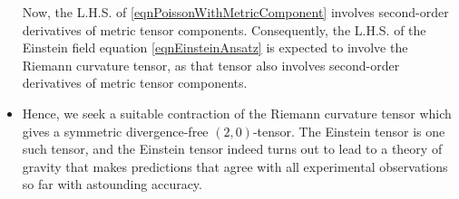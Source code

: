 \begin{itemize}
	Now, the L.H.S. of \eqref{eqnPoissonWithMetricComponent} involves
	second-order derivatives of metric tensor components.
	Consequently, the L.H.S. of the Einstein field equation \eqref{eqnEinsteinAnsatz} is expected to involve
	the Riemann curvature tensor, as that tensor also involves second-order derivatives of metric tensor components.
\item
	Hence, we seek a suitable contraction of the Riemann curvature tensor
	which gives a symmetric divergence-free $(2,0)$-tensor.
	The Einstein tensor is one such tensor, and the Einstein tensor
	indeed turns out to lead to a theory of gravity that makes predictions that agree
	with all experimental observations so far with astounding accuracy.
\end{itemize}


\vskip 0.3cm
\noindent





